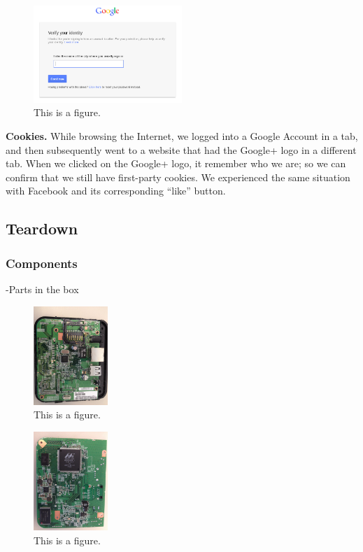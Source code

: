 \begin{figure}[htb]
\begin{center}
\includegraphics[width=0.5\textwidth]{funnygoogle}
\caption{This is a figure.}
\label{fig:funnygoogle}
\end{center}
\end{figure}

{\bf Cookies.}  While browsing the Internet, we logged into a Google Account in a tab, and then subsequently went to a website that had the Google+ logo in a different tab.  When we clicked on the Google+ logo, it remember who we are; so we can confirm that we still have first-party cookies.  We experienced the same situation with Facebook and its corresponding ``like'' button.

\subsection{Teardown}
\label{sec:tear}

\subsubsection{Components}
    -Parts in the box

\begin{figure}[htb]
\begin{center}
\includegraphics[width=0.25\textwidth]{safeplug_top}
\caption{This is a figure.}
\end{center}
\end{figure}

\begin{figure}[htb]
\begin{center}
\includegraphics[width=0.25\textwidth]{safeplug_bottom}
\caption{This is a figure.}
\end{center}
\end{figure}

